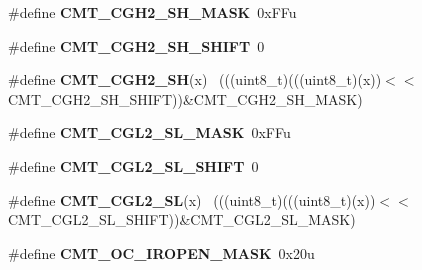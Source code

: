 \begin{DoxyCompactItemize}
\item 
\hypertarget{group___c_m_t___register___masks_ga8637e794f015ee608b47a547e35a72ea}{}\#define {\bfseries C\+M\+T\+\_\+\+C\+G\+H2\+\_\+\+S\+H\+\_\+\+M\+A\+S\+K}~0x\+F\+Fu\label{group___c_m_t___register___masks_ga8637e794f015ee608b47a547e35a72ea}

\item 
\hypertarget{group___c_m_t___register___masks_gafcef3256a8434ecb052c1e6fa0226459}{}\#define {\bfseries C\+M\+T\+\_\+\+C\+G\+H2\+\_\+\+S\+H\+\_\+\+S\+H\+I\+F\+T}~0\label{group___c_m_t___register___masks_gafcef3256a8434ecb052c1e6fa0226459}

\item 
\hypertarget{group___c_m_t___register___masks_gaa3a74404a2679da47172d09576a8ba2b}{}\#define {\bfseries C\+M\+T\+\_\+\+C\+G\+H2\+\_\+\+S\+H}(x)                                                  ~(((uint8\+\_\+t)(((uint8\+\_\+t)(x))$<$$<$C\+M\+T\+\_\+\+C\+G\+H2\+\_\+\+S\+H\+\_\+\+S\+H\+I\+F\+T))\&C\+M\+T\+\_\+\+C\+G\+H2\+\_\+\+S\+H\+\_\+\+M\+A\+S\+K)\label{group___c_m_t___register___masks_gaa3a74404a2679da47172d09576a8ba2b}

\item 
\hypertarget{group___c_m_t___register___masks_gafd7f251bad02bcf7549874db413adcf9}{}\#define {\bfseries C\+M\+T\+\_\+\+C\+G\+L2\+\_\+\+S\+L\+\_\+\+M\+A\+S\+K}~0x\+F\+Fu\label{group___c_m_t___register___masks_gafd7f251bad02bcf7549874db413adcf9}

\item 
\hypertarget{group___c_m_t___register___masks_ga5a5d53932d1fcce0a0f2e9fc29400df8}{}\#define {\bfseries C\+M\+T\+\_\+\+C\+G\+L2\+\_\+\+S\+L\+\_\+\+S\+H\+I\+F\+T}~0\label{group___c_m_t___register___masks_ga5a5d53932d1fcce0a0f2e9fc29400df8}

\item 
\hypertarget{group___c_m_t___register___masks_ga7875c0e5f5a2eeb12ed641f1fa64ba19}{}\#define {\bfseries C\+M\+T\+\_\+\+C\+G\+L2\+\_\+\+S\+L}(x)                                                  ~(((uint8\+\_\+t)(((uint8\+\_\+t)(x))$<$$<$C\+M\+T\+\_\+\+C\+G\+L2\+\_\+\+S\+L\+\_\+\+S\+H\+I\+F\+T))\&C\+M\+T\+\_\+\+C\+G\+L2\+\_\+\+S\+L\+\_\+\+M\+A\+S\+K)\label{group___c_m_t___register___masks_ga7875c0e5f5a2eeb12ed641f1fa64ba19}

\item 
\hypertarget{group___c_m_t___register___masks_ga7f61dcc57756388d9e913eb3653c2e58}{}\#define {\bfseries C\+M\+T\+\_\+\+O\+C\+\_\+\+I\+R\+O\+P\+E\+N\+\_\+\+M\+A\+S\+K}~0x20u\label{group___c_m_t___register___masks_ga7f61dcc57756388d9e913eb3653c2e58}


\end{DoxyCompactItemize}
